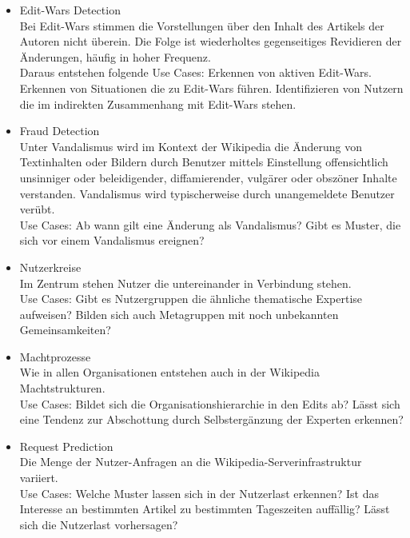 \begin{itemize}
    \item Edit-Wars Detection\\ Bei Edit-Wars stimmen die Vorstellungen über den Inhalt des Artikels der Autoren nicht überein. Die Folge ist wiederholtes gegenseitiges Revidieren der Änderungen, häufig in hoher Frequenz.\cite{wikipediaprob.}\\ Daraus entstehen folgende Use Cases: Erkennen von aktiven Edit-Wars. Erkennen von Situationen die zu Edit-Wars führen. Identifizieren von Nutzern die im indirekten Zusammenhang mit Edit-Wars stehen.
    \item Fraud Detection\\Unter Vandalismus wird im Kontext der Wikipedia die Änderung von Textinhalten oder Bildern durch Benutzer mittels Einstellung offensichtlich unsinniger oder beleidigender, diffamierender, vulgärer oder obszöner Inhalte verstanden. Vandalismus wird typischerweise durch unangemeldete Benutzer verübt.\cite{wikipediaprob.} \\Use Cases: Ab wann gilt eine Änderung als Vandalismus? Gibt es Muster, die sich vor einem Vandalismus ereignen? 
    \item Nutzerkreise\\Im Zentrum stehen Nutzer die untereinander in Verbindung stehen.\\Use Cases: Gibt es Nutzergruppen die ähnliche thematische Expertise aufweisen? Bilden sich auch Metagruppen mit noch unbekannten Gemeinsamkeiten?
    \item Machtprozesse\\Wie in allen Organisationen entstehen auch in der Wikipedia Machtstrukturen.\\Use Cases: Bildet sich die Organisationshierarchie in den Edits ab? Lässt sich eine Tendenz zur Abschottung durch Selbstergänzung der Experten erkennen?\cite{wikipedia.}
    \item Request Prediction\\Die Menge der Nutzer-Anfragen an die Wikipedia-Serverinfrastruktur variiert.\\Use Cases: Welche Muster lassen sich in der Nutzerlast erkennen? Ist das Interesse an bestimmten Artikel zu bestimmten Tageszeiten auffällig? Lässt sich die Nutzerlast vorhersagen?
\end{itemize}
